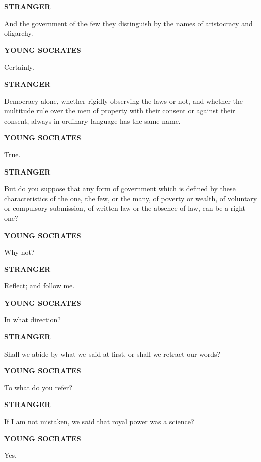 \documentclass[11pt,letter]{article}
\begin{document}
\par \textbf{STRANGER}
\par   And the government of the few they distinguish by the names of aristocracy and oligarchy.

\par \textbf{YOUNG SOCRATES}
\par   Certainly.

\par \textbf{STRANGER}
\par   Democracy alone, whether rigidly observing the laws or not, and whether the multitude rule over the men of property with their consent or against their consent, always in ordinary language has the same name.

\par \textbf{YOUNG SOCRATES}
\par   True.

\par \textbf{STRANGER}
\par   But do you suppose that any form of government which is defined by these characteristics of the one, the few, or the many, of poverty or wealth, of voluntary or compulsory submission, of written law or the absence of law, can be a right one?

\par \textbf{YOUNG SOCRATES}
\par   Why not?

\par \textbf{STRANGER}
\par   Reflect; and follow me.

\par \textbf{YOUNG SOCRATES}
\par   In what direction?

\par \textbf{STRANGER}
\par   Shall we abide by what we said at first, or shall we retract our words?

\par \textbf{YOUNG SOCRATES}
\par   To what do you refer?

\par \textbf{STRANGER}
\par   If I am not mistaken, we said that royal power was a science?

\par \textbf{YOUNG SOCRATES}
\par   Yes.
\end{document}
